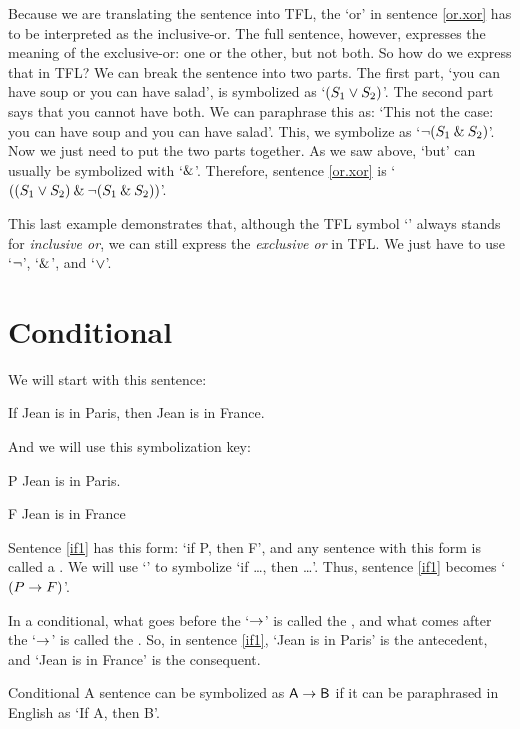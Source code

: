Because we are translating the sentence into TFL, the `or' in sentence \ref{or.xor} has to be interpreted as the inclusive-or. The full sentence, however, expresses the meaning of the exclusive-or: one or the other, but not both. So how do we express that in TFL? We can break the sentence into two parts. The first part, `you can have soup or you can have salad', is symbolized as `$(S_1 \vee S_2)$'. The second part says that you cannot have both. We can paraphrase this as: `This not the case: you can have soup and you can have salad'. This, we symbolize as `${\neg}(S_1 \mathbin{\&} S_2)$'. Now we just need to put the two parts together. As we saw above, `but' can usually be symbolized with `$\mathbin{\&}$'. Therefore, sentence \ref{or.xor} is `$((S_1 \vee S_2) \mathbin{\&} {\neg}(S_1 \mathbin{\&} S_2))$'.

This last example demonstrates that, although the TFL symbol `\eor' always stands for \emph{inclusive or}, we can still express the \emph{exclusive or} in {TFL}. We just have to use `${\neg}$', `$\mathbin{\&}$', and `$\vee$'.

\section{Conditional}

We will start with this sentence:
	\begin{earg}
		\item[\ex{if1}] If Jean is in Paris, then Jean is in France.
	\end{earg}
And we will use this symbolization key:
	\begin{ekey}
		\item[P] Jean is in Paris.
		\item[F] Jean is in France
	\end{ekey}
Sentence \ref{if1} has this form: `if P, then F', and any sentence with this form is called a . We will use `\eif' to symbolize `if \ldots, then \ldots'. Thus, sentence \ref{if1} becomes `$(P\rightarrow F)$'. 

In a conditional, what goes before the `$\rightarrow$'  is called the , and what comes after the `$\rightarrow$' is called the . So, in sentence \ref{if1}, `Jean is in Paris' is the antecedent, and `Jean is in France' is the consequent.

\begin{factboxy}{Conditional}
		A sentence can be symbolized as $\mathsf{A} \rightarrow \mathsf{B}$ if it can be paraphrased in English as `If A, then B'.
\end{factboxy}

